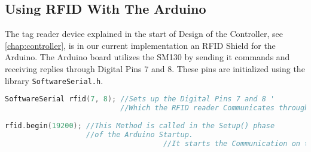 \subsection{Using RFID With The Arduino}
\label{sec:rfidsect}
The tag reader device explained in the start of Design of the Controller, see \vref{chap:controller}, is in our current implementation an RFID Shield for the Arduino.
The Arduino board utilizes the SM130 by sending it commands and receiving replies through Digital Pins 7 and 8.
These pins are initialized using the library \verb|SoftwareSerial.h|\citep{softlib}.\\
\begin{lstlisting}[frame=single, language=C, label=pageRFID, caption=The RFID Code Initialization.]
SoftwareSerial rfid(7, 8); //Sets up the Digital Pins 7 and 8 '
                           //Which the RFID reader Communicates through.
													
rfid.begin(19200); //This Method is called in the Setup() phase 
                   //of the Arduino Startup.
									 //It starts the Communication on the standard baud rate
\end{lstlisting}

